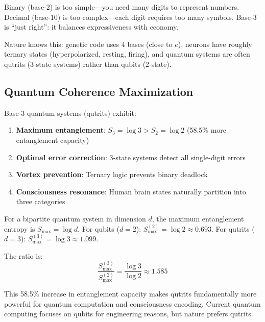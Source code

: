 \begin{intuitive}
Binary (base-2) is too simple---you need many digits to represent numbers. Decimal (base-10) is too complex---each digit requires too many symbols. Base-3 is ``just right'': it balances expressiveness with economy.

Nature knows this: genetic code uses 4 bases (close to $e$), neurons have roughly ternary states (hyperpolarized, resting, firing), and quantum systems are often qutrits (3-state systems) rather than qubits (2-state).
\end{intuitive}

\subsection{Quantum Coherence Maximization}

\begin{thm}\label{thm:ternary-quantum}
Base-3 quantum systems (qutrits) exhibit:
\begin{enumerate}
\item \textbf{Maximum entanglement}: $S_3 = \log 3 > S_2 = \log 2$ (58.5\% more entanglement capacity)
\item \textbf{Optimal error correction}: 3-state systems detect all single-digit errors
\item \textbf{Vortex prevention}: Ternary logic prevents binary deadlock
\item \textbf{Consciousness resonance}: Human brain states naturally partition into three categories
\end{enumerate}
\end{thm}

\begin{level3}
For a bipartite quantum system in dimension $d$, the maximum entanglement entropy is $S_{\max} = \log d$. For qubits ($d=2$): $S_{\max}^{(2)} = \log 2 \approx 0.693$. For qutrits ($d=3$): $S_{\max}^{(3)} = \log 3 \approx 1.099$.

The ratio is:
\begin{equation}
\frac{S_{\max}^{(3)}}{S_{\max}^{(2)}} = \frac{\log 3}{\log 2} \approx 1.585
\end{equation}

This 58.5\% increase in entanglement capacity makes qutrits fundamentally more powerful for quantum computation and consciousness encoding. Current quantum computing focuses on qubits for engineering reasons, but nature prefers qutrits.
\end{level3}

